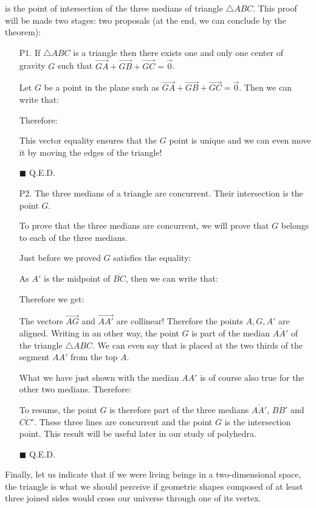 {\begin{theorem}
	is the point of intersection of the three medians of triangle $\triangle ABC$. This proof will be made two stages: two proposals (at the end, we can conclude by the theorem):
	\begin{enumerate}
		\item[P1.] If $\triangle ABC$ is a triangle then there exists one and only one center of gravity $G$ such that $\overrightarrow{GA}+\overrightarrow{GB}+\overrightarrow{GC}=\vec{0}$.
		\begin{dem}
		Let $G$ be a point in the plane such as $\overrightarrow{GA}+\overrightarrow{GB}+\overrightarrow{GC}=\vec{0}$. Then we can write that:
		
		Therefore:
		
		This vector equality ensures that the $G$ point is unique and we can even move it by moving the edges of the triangle!
		\begin{flushright}
			$\blacksquare$  Q.E.D.
		\end{flushright}
		\end{dem}
		\item[P2.] The three medians of a triangle are concurrent. Their intersection is the point $G$.
		\begin{dem}
		To prove that the three medians are concurrent, we will prove that $G$ belongs to each of the three medians.
		
		Just before we proved $G$ satisfies the equality:
		
		As $A'$ is the midpoint of $\overline{BC}$, then we can write that:
		
		Therefore we get:
		
		The vectors $\overrightarrow{AG}$ and $\overrightarrow{AA'}$ are collinear! Therefore the points $A, G, A'$ are aligned. Writing in an other way, the point $G$ is part of the median $\overline{AA'}$ of the triangle $\triangle ABC$. We can even say that is placed at the two thirds of the segment $\overline{AA'}$ from the top $A$.
		
		What we have just shown with the median $AA'$ is of course also true for the other two medians. Therefore:
		
		To resume, the point $G$ is therefore part of the three medians $\overline{AA'}$, $\overline{BB'}$ and $\overline{CC'}$. These three lines are concurrent and the point $G$ is the intersection point. This result will be useful later in our study of polyhedra.
		\begin{flushright}
			$\blacksquare$  Q.E.D.
		\end{flushright}
		\end{dem}
	\end{enumerate}
	\end{theorem}
	Finally, let us indicate that if we were living beings in a two-dimensional space, the triangle is what we should perceive if geometric shapes composed of at least three joined sides would cross our universe through one of its vertex.
	
}
